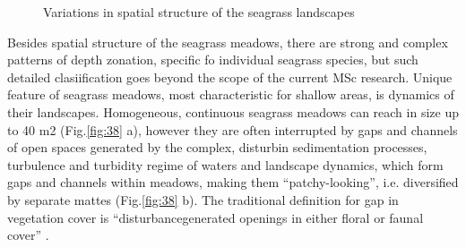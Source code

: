 \documentclass[10pt, a4paper]{article}
\begin{document}
\begin{figure}[h]
	\centering
	\caption{Variations in spatial structure of the seagrass landscapes}
	\label{fig:40}
\end{figure}

Besides spatial structure of the seagrass meadows, there are strong and complex patterns of depth zonation, specific fo individual
seagrass species, but such detailed clasiification goes beyond the scope of the current MSc research.
Unique feature of seagrass meadows, most characteristic for shallow areas, is dynamics of their
landscapes. Homogeneous, continuous seagrass meadows can reach in size up to 40 m2 (Fig.\ref{fig:38} a),
however they are often interrupted by gaps and channels of open spaces generated by the complex,
disturbin sedimentation processes, turbulence and turbidity regime of waters and landscape dynamics,
which form gaps and channels within meadows, making them “patchy-looking”, i.e. diversified by
separate mattes (Fig.\ref{fig:38} b). The traditional definition for gap in vegetation cover is “disturbancegenerated
openings in either floral or faunal cover” \cite{Connell78}\label{Connell78}.
\end{document}
